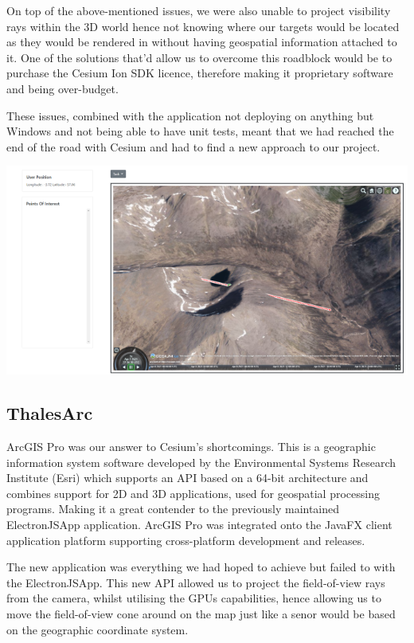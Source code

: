 \documentclass{l3proj}
\begin{document}
On top of the above-mentioned issues, we were also unable to project visibility rays within the 3D world hence not knowing where our targets would be located as they would be rendered in without having geospatial information attached to it. One of the solutions that'd allow us to overcome this roadblock would be to purchase the Cesium Ion SDK licence\cite{ion}, therefore making it proprietary software and being over-budget.

These issues, combined with the application not deploying on anything but Windows and not being able to have unit tests, meant that we had reached the end of the road with Cesium and had to find a new approach to our project.

\includegraphics[width=\textwidth]{ElectronJSApp2}


\subsection{ThalesArc}

ArcGIS Pro\cite{arcgis} was our answer to Cesium’s shortcomings. This is a geographic information system software developed by the Environmental Systems Research Institute (Esri)\cite{esri} which supports an API based on a 64-bit architecture and combines support for 2D and 3D applications, used for geospatial processing programs. Making it a great contender to the previously maintained ElectronJSApp application. ArcGIS Pro was integrated onto the JavaFX\cite{javaFX} client application platform supporting cross-platform development and releases.

The new application was everything we had hoped to achieve but failed to with the ElectronJSApp. This new API allowed us to project the field-of-view rays from the camera, whilst utilising the GPUs capabilities, hence allowing us to move the field-of-view cone around on the map just like a senor would be based on the geographic coordinate system.
\end{document}
